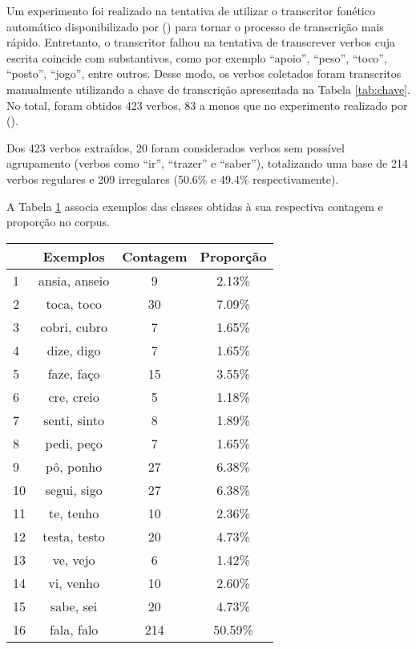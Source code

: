  Um experimento foi realizado na tentativa de utilizar o transcritor fonético automático disponibilizado por (\cite{guide:2016}) para tornar o processo de transcrição mais rápido. Entretanto, o transcritor falhou na tentativa de transcrever verbos cuja escrita coincide com substantivos, como por exemplo “apoio”, “peso”, “toco”, “posto”, “jogo”, entre outros. Desse modo, os verbos coletados foram transcritos manualmente utilizando a chave de transcrição apresentada na Tabela \ref{tab:chave}. No total, foram obtidos 423 verbos, 83 a menos que no experimento realizado por (\cite{rumelhart:1986}).

Dos 423 verbos extraídos, 20 foram considerados verbos sem possível agrupamento (verbos como “ir”, “trazer” e “saber”), totalizando uma base de 214 verbos regulares e 209 irregulares (50.6\% e 49.4\% respectivamente). 

A Tabela \ref{tab:classes} associa exemplos das classes obtidas à sua respectiva contagem e proporção no corpus.

\begin{table}[H]
\begin{center}
\begin{tabular}{|l|c|c|c|}
\toprule
 & Exemplos & Contagem & Proporção\\
\midrule
1  & ansia, anseio & 9 & 2.13\%\\
2  & toca, toco & 30 & 7.09\%\\
3  & cobri, cubro & 7 & 1.65\%\\
4  & dize, digo & 7 & 1.65\%\\
5 & faze, faço & 15 & 3.55\%\\
6  & cre, creio & 5 & 1.18\%\\
7  & senti, sinto & 8 & 1.89\% \\
8  & pedi, peço & 7 & 1.65\%\\
9  & pô, ponho & 27 & 6.38\%\\
10  & segui, sigo & 27 & 6.38\%\\
11  & te, tenho & 10 & 2.36\%\\
12  & testa, testo & 20 & 4.73\%\\
13  & ve, vejo & 6 & 1.42\%\\
14  & vi, venho & 10 & 2.60\%\\
15 & sabe, sei & 20 & 4.73\%\\
16  & fala, falo & 214 & 50.59\%\\
\bottomrule
\end{tabular}
\end{center}
\label{tab:classes}
\end{table}

